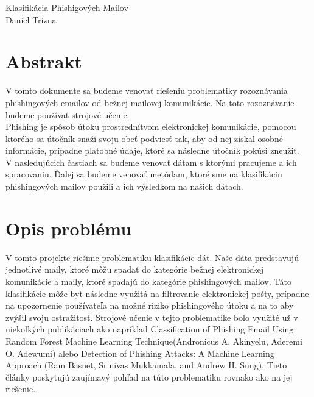 \documentclass[12pt]{article}
\begin{document}
\begin{titlepage}
    \vspace*{\fill}
    \begin{center}
      {\LARGE Klasifikácia Phishigových Mailov}\\[0.25cm]
      {\Large Daniel Trizna}\\
    \end{center}
    \vspace*{\fill}
  \end{titlepage}
\newpage

\section*{Abstrakt}
V tomto dokumente sa budeme venovať riešeniu problematiky rozoznávania phishingových emailov od bežnej mailovej komunikácie. Na toto rozoznávanie budeme používať strojové učenie.\\

Phishing je spôsob útoku prostrednítvom elektronickej komunikácie, pomocou ktorého sa útočník snaží svoju obeť podviesť tak, aby od nej získal osobné informácie, prípadne platobné údaje, ktoré sa následne útočník pokúsi zneužiť.\\

V nasledujúcich častiach sa budeme venovať dátam s ktorými pracujeme a ich spracovaniu. Ďalej sa budeme venovať metódam, ktoré sme na klasifikáciu phishingových mailov použili a ich výsledkom na našich dátach.

\section*{Opis problému}
V tomto projekte riešime problematiku klasifikácie dát. Naše dáta predstavujú jednotlivé maily, ktoré môžu spadať do kategórie bežnej elektronickej komunikácie a maily, ktoré spadajú do kategórie phishingových mailov. Táto klasifikácie môže byť následne využitá na filtrovanie elektronickej pošty, prípadne na upozornenie používateľa na možné riziko phishingového útoku a na to aby zvýšil svoju ostražitosť. Strojové učenie v tejto problematike bolo využité už v niekoľkých publikáciach ako napríklad Classification of Phishing Email Using Random Forest Machine Learning Technique(Andronicus A. Akinyelu, Aderemi O. Adewumi) alebo Detection of Phishing Attacks: A Machine Learning Approach (Ram Basnet, Srinivas Mukkamala, and Andrew H. Sung). Tieto články poskytujú zaujímavý pohľad na túto problematiku rovnako ako na jej riešenie.
\end{document}
